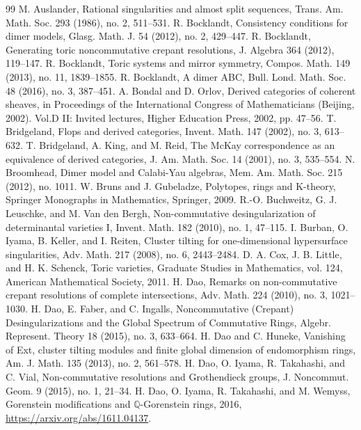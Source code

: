 \documentclass[11pt]{amsart}
\theoremstyle{definition}
\begin{document}
\begin{thebibliography}{99}
 M. Auslander, Rational singularities and almost split sequences, Trans. Am. Math. Soc. 293 (1986), no. 2, 511--531.
 R. Bocklandt, Consistency conditions for dimer models, Glasg. Math. J. 54 (2012), no. 2, 429--447.
 R. Bocklandt, Generating toric noncommutative crepant resolutions, J. Algebra 364 (2012), 119--147.
 R. Bocklandt, Toric systems and mirror symmetry, Compos. Math. 149 (2013), no. 11, 1839--1855.
 R. Bocklandt, A dimer ABC, Bull. Lond. Math. Soc. 48 (2016), no. 3, 387--451.
 A. Bondal and D. Orlov, Derived categories of coherent sheaves, in Proceedings of the International Congress of Mathematicians (Beijing, 2002). Vol.D II: Invited lectures, Higher Education Press, 2002, pp. 47--56.
 T. Bridgeland, Flops and derived categories, Invent. Math. 147 (2002), no. 3, 613--632.
 T. Bridgeland, A. King, and M. Reid, The McKay correspondence as an equivalence of derived categories, J. Am. Math. Soc. 14 (2001), no. 3, 535--554.
 N. Broomhead, Dimer model and Calabi-Yau algebras, Mem. Am. Math. Soc. 215 (2012), no. 1011.
 W. Bruns and J. Gubeladze, Polytopes, rings and K-theory, Springer Monographs in Mathematics, Springer, 2009.
 R.-O. Buchweitz, G. J. Leuschke, and M. Van den Bergh, Non-commutative desingularization of determinantal varieties I, Invent. Math. 182 (2010), no. 1, 47--115.
 I. Burban, O. Iyama, B. Keller, and I. Reiten, Cluster tilting for one-dimensional hypersurface singularities, Adv. Math. 217 (2008), no. 6, 2443--2484.
 D. A. Cox, J. B. Little, and H. K. Schenck, Toric varieties, Graduate Studies in Mathematics, vol. 124, American Mathematical Society, 2011.
 H. Dao, Remarks on non-commutative crepant resolutions of complete intersections, Adv. Math. 224 (2010), no. 3, 1021--1030.
 H. Dao, E. Faber, and C. Ingalls, Noncommutative (Crepant) Desingularizations and the Global Spectrum of Commutative Rings, Algebr. Represent. Theory 18 (2015), no. 3, 633--664.
 H. Dao and C. Huneke, Vanishing of Ext, cluster tilting modules and finite global dimension of endomorphism rings, Am. J. Math. 135 (2013), no. 2, 561--578.
 H. Dao, O. Iyama, R. Takahashi, and C. Vial, Non-commutative resolutions and Grothendieck groups, J. Noncommut. Geom. 9 (2015), no. 1, 21--34.
 H. Dao, O. Iyama, R. Takahashi, and M. Wemyss, Gorenstein modifications and $\mathbb{Q}$-Gorenstein rings, 2016, \url{https://arxiv.org/abs/1611.04137}.

\end{thebibliography}
\end{document}
